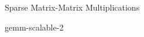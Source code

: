 \begin{frame}{Sparse Matrix-Matrix Multiplications}
\begin{center}
gemm-scalable-2
\end{center}
\end{frame}
